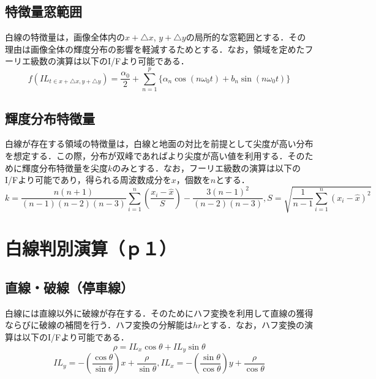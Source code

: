 \documentclass{jsarticle}
\begin{document}
\subsection{特徴量窓範囲}
\label{特徴量窓範囲}

白線の特徴量は，画像全体内の$x+\bigtriangleup x$, $y+\bigtriangleup y$の局所的な窓範囲とする．その理由は画像全体の輝度分布の影響を軽減するためとする．なお，領域を定めたフーリエ級数の演算は以下のI/Fより可能である．
\[
f(IL_{t \in x+\bigtriangleup x,y+\bigtriangleup y}) = \frac{\alpha_0}{2} + \sum_{n=1}^p \{ \alpha_n \cos(n \omega_0 t) + b_n \sin(n \omega_0 t)\}
\]
\begin{center}
\end{center}

\subsection{輝度分布特徴量}
\label{輝度分布特徴量}

白線が存在する領域の特徴量は，白線と地面の対比を前提として尖度が高い分布を想定する．この際，分布が双峰であればより尖度が高い値を利用する．そのために輝度分布特徴量を尖度$k$のみとする．なお，フーリエ級数の演算は以下のI/Fより可能であり，得られる周波数成分を$x$，個数を$n$とする．
\[
k=\frac{n(n+1)}{(n-1)(n-2)(n-3)} \sum_{i=1}^n (\frac{x_i - \hat{x}}{S}) - \frac{3(n-1)^2}{(n-2)(n-3)}, S=\sqrt{\frac{1}{n-1} \sum_{i=1}^n (x_i-\hat{x})^2}
\]
\begin{center}
\end{center}

\section{白線判別演算（ｐ１）}
\label{白線判別演算（ｐ１）}

\subsection{直線・破線（停車線）}
\label{直線・破線（停車線）}

白線には直線以外に破線が存在する．そのためにハフ変換を利用して直線の獲得ならびに破線の補間を行う．ハフ変換の分解能は$hr$とする．なお，ハフ変換の演算は以下のI/Fより可能である．
\[
\rho=IL_x \cos \theta + IL_y \sin \theta
\]
\[
IL_y = -(\frac{\cos \theta}{\sin \theta}) x + \frac{\rho}{\sin \theta},
IL_x = -(\frac{\sin \theta}{\cos \theta})y + \frac{\rho}{\cos \theta}
\]
\begin{center}
\end{center}
\end{document}
